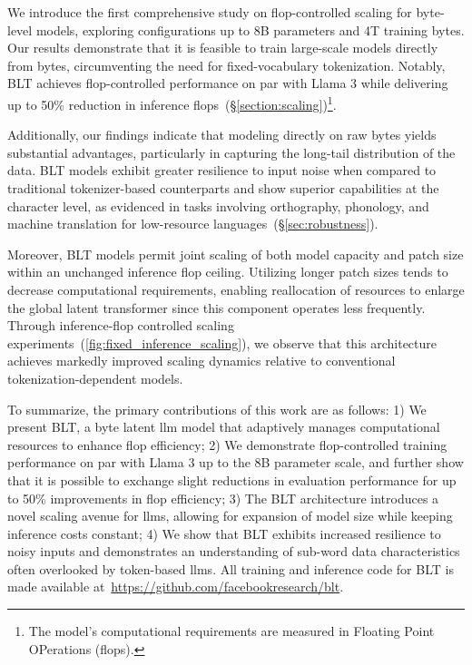 We introduce the first comprehensive study on flop-controlled scaling for byte-level models, exploring configurations up to 8B parameters and 4T training bytes. Our results demonstrate that it is feasible to train large-scale models directly from bytes, circumventing the need for fixed-vocabulary tokenization. Notably, {\textsc BLT} achieves flop-controlled performance on par with Llama 3 while delivering up to 50\% reduction in inference flops~(\S\ref{section:scaling})\footnote{The model's computational requirements are measured in Floating Point OPerations (flops).}. 

Additionally, our findings indicate that modeling directly on raw bytes yields substantial advantages, particularly in capturing the long-tail distribution of the data. {\textsc BLT} models exhibit greater resilience to input noise when compared to traditional tokenizer-based counterparts and show superior capabilities at the character level, as evidenced in tasks involving orthography, phonology, and machine translation for low-resource languages~(\S\ref{sec:robustness}).

Moreover, {\textsc BLT} models permit joint scaling of both model capacity and patch size within an unchanged inference flop ceiling. Utilizing longer patch sizes tends to decrease computational requirements, enabling reallocation of resources to enlarge the global latent transformer since this component operates less frequently. Through inference-flop controlled scaling experiments~(\autoref{fig:fixed_inference_scaling}), we observe that this architecture achieves markedly improved scaling dynamics relative to conventional tokenization-dependent models.

To summarize, the primary contributions of this work are as follows: 1) We present {\textsc BLT}, a byte latent llm model that adaptively manages computational resources to enhance flop efficiency; 2) We demonstrate flop-controlled training performance on par with Llama 3 up to the 8B parameter scale, and further show that it is possible to exchange slight reductions in evaluation performance for up to 50\% improvements in flop efficiency; 3) The {\textsc BLT} architecture introduces a novel scaling avenue for llms, allowing for expansion of model size while keeping inference costs constant; 4) We show that {\textsc BLT} exhibits increased resilience to noisy inputs and demonstrates an understanding of sub-word data characteristics often overlooked by token-based llms. All training and inference code for {\textsc BLT} is made available at~\url{https://github.com/facebookresearch/blt}.


